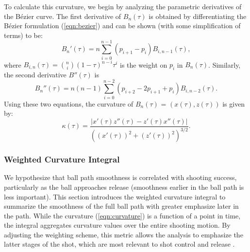 \documentclass{article}
\begin{document}
          To calculate this curvature, we begin by analyzing the parametric derivatives of the Bézier curve. The first derivative of \(B_n(\tau)\) is obtained by differentiating the Bézier formulation (\ref{eqn:bezier}) and can be shown (with some simplification of terms) to be:
          \[ 
            B_n'(\tau) = n \sum_{i=0}^{n-1} (p_{i+1} - p_i) B_{i,n-1}(\tau),
          \]
          where \(B_{i, n}(\tau) = \binom{n}{i}(1 - \tau)^{n-i}\tau^i\) is the weight on $p_i$ in $B_n(\tau)$. Similarly, the second derivative \( B''(\tau) \) is
          \[
            B_n''(\tau) = n(n-1) \sum_{i=0}^{n-2} (p_{i+2} - 2p_{i+1} + p_i) B_{i,n-2}(\tau).
          \]
          Using these two equations, the curvature of \(B_n(\tau)\) = \((x(\tau), z(\tau))\) is given by:
          \begin{equation}
          \label{eqn:curvature}
            \kappa(\tau) = \frac{\left| x'(\tau) z''(\tau) - z'(\tau) x''(\tau) \right|}{\left( (x'(\tau))^2 + (z'(\tau))^2 \right)^{3/2}}.
          \end{equation}
    
        \subsubsection{Weighted Curvature Integral}
        \label{sec:weighted-curvature-integral}
    
        
          We hypothesize that ball path smoothness is correlated with shooting success, particularly as the ball approaches release (smoothness earlier in the ball path is less important). This section introduces the weighted curvature integral to summarize the smoothness of the full ball path with greater emphasize later in the path. While the curvature (\ref{eqn:curvature}) is a function of a point in time, the integral aggregates curvature values over the entire shooting motion. By adjusting the weighting scheme, this metric allows the analysis to emphasize the latter stages of the shot, which are most relevant to shot control and release \citep{button_examining_2003}.
\end{document}
